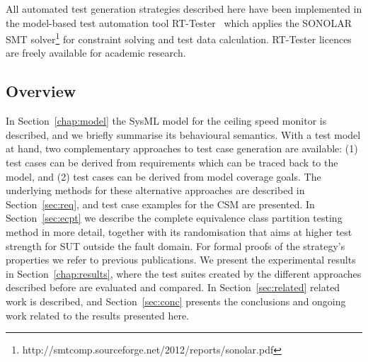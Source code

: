 All automated test generation strategies described here have been implemented 
in the model-based test automation tool RT-Tester~\cite{EPTCS111.1} which applies 
the SONOLAR SMT solver\footnote{http://smtcomp.sourceforge.net/2012/reports/sonolar.pdf} for constraint solving and test data calculation. RT-Tester licences are
 freely available for academic research.



\subsection{Overview}
In Section~\ref{chap:model} the SysML model for the ceiling speed monitor
is described, and we briefly summarise 
its behavioural semantics. With a test model at hand, two complementary approaches to test 
case generation are available: (1) test cases can be derived from requirements which 
can be traced back to the model, and (2) test cases can be derived from model coverage
goals. The underlying methods for these alternative approaches are described in 
Section~\ref{sec:req}, and test case examples for the CSM are presented. 
In 
Section~\ref{sec:ecpt} we describe the complete equivalence class partition testing method
in more detail, together with its randomisation that aims at higher test strength for
SUT outside the fault domain. For formal proofs of the strategy's properties we refer 
to previous publications.
We present the experimental results in Section~\ref{chap:results}, where the 
  test suites created by the different approaches described before
    are evaluated and compared.
In Section~\ref{sec:related} related work is described, and Section~\ref{sec:conc}
presents the conclusions and ongoing work related to the results presented here.
 